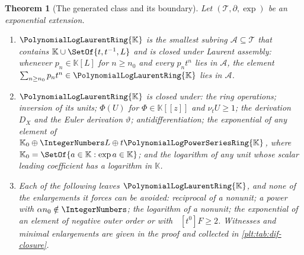 \documentclass[11pt,oneside]{article}
\theoremstyle{plain}
\newtheorem{theorem}{Theorem}[section]
\theoremstyle{definition}
\theoremstyle{remark}
\newcommand{\K}{\mathbb{K}}
\newcommand{\PLpow}{\PolynomialLogPowerSeriesRing{\K}}   %
\newcommand{\PLlau}{\PolynomialLogLaurentRing{\K}}       %
\newcommand{\ordt}{\nu_{t}}                              %
\DeclareMathOperator{\degL}{deg_{L}}
\newcommand{\DX}{D_{X}}                                  %
\newcommand{\EulerOp}{\vartheta}                         %
\begin{document}
\begin{theorem}[The generated class and its boundary]
\label{plt:thm:dif-generated}
Let \((\mathcal T,\partial,\exp)\) be an exponential extension.
\begin{enumerate}
\item \(\PLlau\) is the smallest subring \(\mathcal A\subseteq\mathcal T\) that
      contains \(\K\cup\SetOf{t,t^{-1},L}\) and is closed under Laurent
      assembly: whenever \(p_{n}\in\K[L]\) for \(n\ge n_{0}\) and every
      \(p_{n}t^{n}\) lies in \(\mathcal A\), the element
      \(\sum_{n\ge n_{0}}p_{n}t^{n}\in\PLlau\) lies in \(\mathcal A\).
\item \(\PLlau\) is closed under: the ring operations; inversion of its units;
      \(\Phi(U)\) for \(\Phi\in\K[[z]]\) and \(\ordt U\ge1\); the derivation
      \(\DX\) and the Euler derivation \(\EulerOp\); antidifferentiation; the
      exponential of any element of \(\K_{0}\oplus\IntegerNumbers L\oplus
      t\PLpow\), where \(\K_{0}=\SetOf{a\in\K:\exp a\in\K}\); and the logarithm
      of any unit whose scalar leading coefficient has a logarithm in \(\K\).
\item Each of the following leaves \(\PLlau\), and none of the enlargements it
      forces can be avoided: reciprocal of a nonunit; a power with
      \(\alpha n_{0}\notin\IntegerNumbers\); the logarithm of a nonunit; the
      exponential of an element of negative outer order or with
      \(\degL[t^{0}]F\ge2\).  Witnesses and minimal enlargements are given in
      the proof and collected in \cref{plt:tab:dif-closure}.
\end{enumerate}
\end{theorem}
\end{document}
